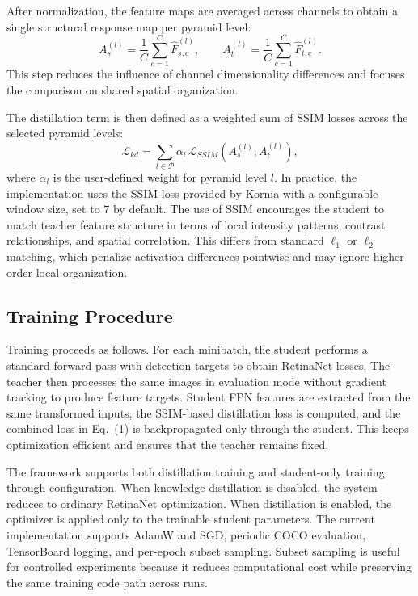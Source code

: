 \documentclass[12pt]{article}
\begin{document}
After normalization, the feature maps are averaged across channels to obtain a single structural response map per pyramid level:
\begin{equation}
A_s^{(l)} = \frac{1}{C}\sum_{c=1}^{C}\hat{F}_{s,c}^{(l)}, \qquad
A_t^{(l)} = \frac{1}{C}\sum_{c=1}^{C}\hat{F}_{t,c}^{(l)}.
\end{equation}
This step reduces the influence of channel dimensionality differences and focuses the comparison on shared spatial organization.

The distillation term is then defined as a weighted sum of SSIM losses across the selected pyramid levels:
\begin{equation}
\mathcal{L}_{kd} = \sum_{l \in \mathcal{P}} \alpha_l \, \mathcal{L}_{SSIM}\left(A_s^{(l)}, A_t^{(l)}\right),
\end{equation}
where $\alpha_l$ is the user-defined weight for pyramid level $l$. In practice, the implementation uses the SSIM loss provided by Kornia with a configurable window size, set to $7$ by default. The use of SSIM encourages the student to match teacher feature structure in terms of local intensity patterns, contrast relationships, and spatial correlation. This differs from standard $\ell_1$ or $\ell_2$ matching, which penalize activation differences pointwise and may ignore higher-order local organization.

\subsection{Training Procedure}
Training proceeds as follows. For each minibatch, the student performs a standard forward pass with detection targets to obtain RetinaNet losses. The teacher then processes the same images in evaluation mode without gradient tracking to produce feature targets. Student FPN features are extracted from the same transformed inputs, the SSIM-based distillation loss is computed, and the combined loss in Eq.~(1) is backpropagated only through the student. This keeps optimization efficient and ensures that the teacher remains fixed.

The framework supports both distillation training and student-only training through configuration. When knowledge distillation is disabled, the system reduces to ordinary RetinaNet optimization. When distillation is enabled, the optimizer is applied only to the trainable student parameters. The current implementation supports AdamW and SGD, periodic COCO evaluation, TensorBoard logging, and per-epoch subset sampling. Subset sampling is useful for controlled experiments because it reduces computational cost while preserving the same training code path across runs.
\end{document}

